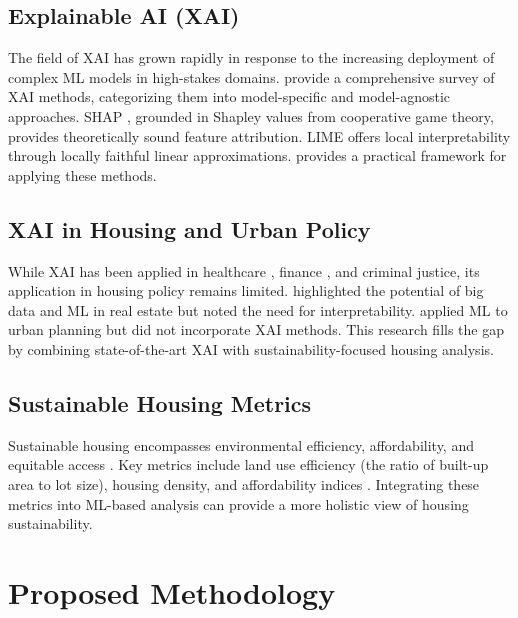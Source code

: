 \documentclass[12pt, a4paper]{article}
\begin{document}
\subsection{Explainable AI (XAI)}

The field of XAI has grown rapidly in response to the increasing deployment of complex ML models in high-stakes domains. \citet{arrieta2020explainable} provide a comprehensive survey of XAI methods, categorizing them into model-specific and model-agnostic approaches. SHAP \citep{lundberg2017unified}, grounded in Shapley values from cooperative game theory, provides theoretically sound feature attribution. LIME \citep{ribeiro2016why} offers local interpretability through locally faithful linear approximations. \citet{molnar2020interpretable} provides a practical framework for applying these methods.

\subsection{XAI in Housing and Urban Policy}

While XAI has been applied in healthcare \citep{holzinger2019causability}, finance \citep{bussmann2021explainable}, and criminal justice, its application in housing policy remains limited. \citet{kok2017big} highlighted the potential of big data and ML in real estate but noted the need for interpretability. \citet{baldominos2018identifying} applied ML to urban planning but did not incorporate XAI methods. This research fills the gap by combining state-of-the-art XAI with sustainability-focused housing analysis.

\subsection{Sustainable Housing Metrics}

Sustainable housing encompasses environmental efficiency, affordability, and equitable access \citep{choguill2007meaning}. Key metrics include land use efficiency (the ratio of built-up area to lot size), housing density, and affordability indices \citep{mulliner2016approach}. Integrating these metrics into ML-based analysis can provide a more holistic view of housing sustainability.

\section{Proposed Methodology}
\end{document}
